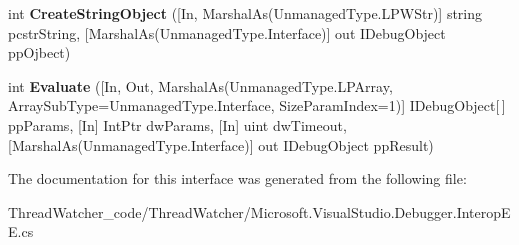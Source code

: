 \begin{DoxyCompactItemize}
\item 
\hypertarget{interface_microsoft_1_1_visual_studio_1_1_debugger_1_1_interop_e_e_1_1_i_debug_function_object_ae0afbc825693e9e245fc330b54326c24}{int {\bfseries Create\+String\+Object} (\mbox{[}In, Marshal\+As(Unmanaged\+Type.\+L\+P\+W\+Str)\mbox{]} string pcstr\+String, \mbox{[}Marshal\+As(Unmanaged\+Type.\+Interface)\mbox{]} out I\+Debug\+Object pp\+Ojbect)}\label{interface_microsoft_1_1_visual_studio_1_1_debugger_1_1_interop_e_e_1_1_i_debug_function_object_ae0afbc825693e9e245fc330b54326c24}

\item 
\hypertarget{interface_microsoft_1_1_visual_studio_1_1_debugger_1_1_interop_e_e_1_1_i_debug_function_object_a3f57a21135e45531ebb04a7c98bd0d21}{int {\bfseries Evaluate} (\mbox{[}In, Out, Marshal\+As(Unmanaged\+Type.\+L\+P\+Array, Array\+Sub\+Type=Unmanaged\+Type.\+Interface, Size\+Param\+Index=1)\mbox{]} I\+Debug\+Object\mbox{[}$\,$\mbox{]} pp\+Params, \mbox{[}In\mbox{]} Int\+Ptr dw\+Params, \mbox{[}In\mbox{]} uint dw\+Timeout, \mbox{[}Marshal\+As(Unmanaged\+Type.\+Interface)\mbox{]} out I\+Debug\+Object pp\+Result)}\label{interface_microsoft_1_1_visual_studio_1_1_debugger_1_1_interop_e_e_1_1_i_debug_function_object_a3f57a21135e45531ebb04a7c98bd0d21}

\end{DoxyCompactItemize}


The documentation for this interface was generated from the following file\+:\begin{DoxyCompactItemize}
\item 
Thread\+Watcher\+\_\+code/\+Thread\+Watcher/Microsoft.\+Visual\+Studio.\+Debugger.\+Interop\+E\+E.\+cs\end{DoxyCompactItemize}
